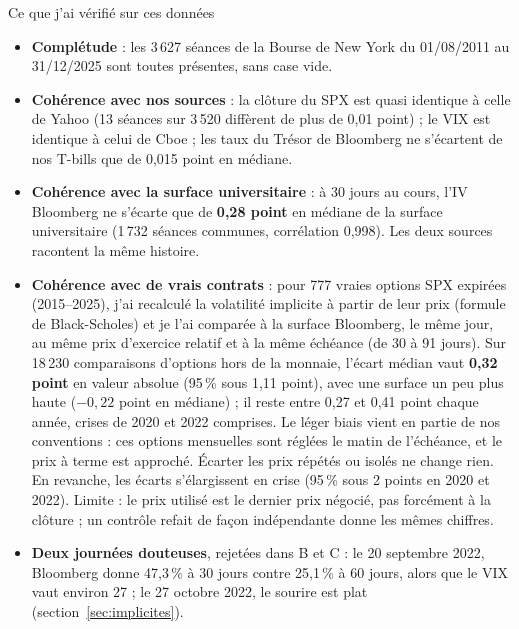\documentclass[10pt,a4paper]{article}
\begin{document}
\begin{valide}{Ce que j'ai vérifié sur ces données}
\begin{itemize}[nosep,leftmargin=*]
  \item \textbf{Complétude} : les 3\,627 séances de la Bourse de New York du 01/08/2011 au 31/12/2025 sont toutes présentes, sans case vide.
  \item \textbf{Cohérence avec nos sources} : la clôture du SPX est quasi identique à celle de Yahoo (13 séances sur 3\,520 diffèrent de plus de 0,01 point) ; le VIX est identique à celui de Cboe ; les taux du Trésor de Bloomberg ne s'écartent de nos T-bills que de 0,015 point en médiane.
  \item \textbf{Cohérence avec la surface universitaire} : à 30 jours au cours, l'IV Bloomberg ne s'écarte que de \textbf{0,28 point} en médiane de la surface universitaire (1\,732 séances communes, corrélation 0,998). Les deux sources racontent la même histoire.
  \item \textbf{Cohérence avec de vrais contrats} : pour 777 vraies options SPX expirées (2015–2025), j'ai recalculé la volatilité implicite à partir de leur prix (formule de Black-Scholes) et je l'ai comparée à la surface Bloomberg, le même jour, au même prix d'exercice relatif et à la même échéance (de 30 à 91 jours). Sur 18\,230 comparaisons d'options hors de la monnaie, l'écart médian vaut \textbf{0,32 point} en valeur absolue (95\,\% sous 1,11 point), avec une surface un peu plus haute ($-0{,}22$ point en médiane) ; il reste entre 0,27 et 0,41 point chaque année, crises de 2020 et 2022 comprises. Le léger biais vient en partie de nos conventions : ces options mensuelles sont réglées le matin de l'échéance, et le prix à terme est approché. Écarter les prix répétés ou isolés ne change rien. En revanche, les écarts s'élargissent en crise (95\,\% sous 2 points en 2020 et 2022). Limite : le prix utilisé est le dernier prix négocié, pas forcément à la clôture ; un contrôle refait de façon indépendante donne les mêmes chiffres.
  \item \textbf{Deux journées douteuses}, rejetées dans B et C : le 20 septembre 2022, Bloomberg donne 47,3\,\% à 30 jours contre 25,1\,\% à 60 jours, alors que le VIX vaut environ 27 ; le 27 octobre 2022, le sourire est plat (section~\ref{sec:implicites}).
\end{itemize}
\end{valide}
\end{document}
